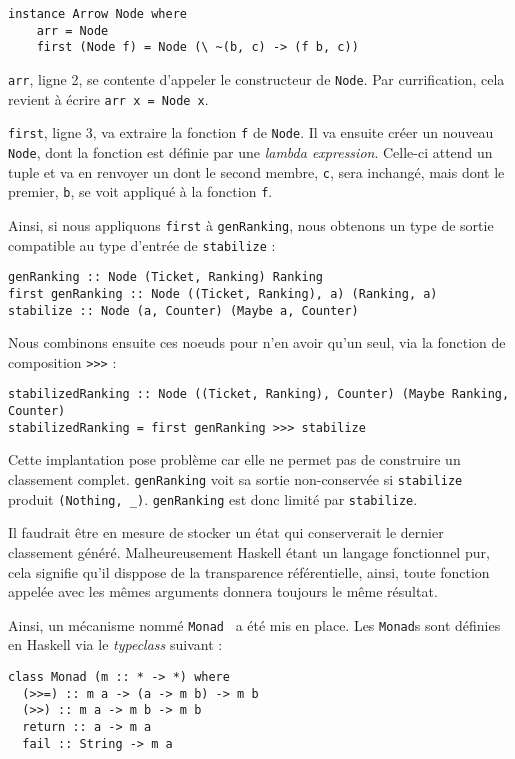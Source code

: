\documentclass{llncs}
\begin{document}
\begin{lstlisting}
instance Arrow Node where
    arr = Node
    first (Node f) = Node (\ ~(b, c) -> (f b, c))
\end{lstlisting}

\lstinline{arr}, ligne 2, se contente d'appeler le constructeur de \lstinline{Node}.
Par currification, cela revient à écrire \lstinline{arr x = Node x}.

\lstinline{first}, ligne 3, va extraire la fonction \lstinline{f} de \lstinline{Node}.
Il va ensuite créer un nouveau \lstinline{Node}, dont la fonction est définie par
une \emph{lambda expression}.
Celle-ci attend un tuple et va en renvoyer un dont le second membre, \lstinline{c},
sera inchangé, mais dont le premier, \lstinline{b}, se voit appliqué à la fonction \lstinline{f}.

Ainsi, si nous appliquons \lstinline{first} à \lstinline{genRanking}, nous obtenons
un type de sortie compatible au type d'entrée de \lstinline{stabilize} :
\begin{lstlisting}
genRanking :: Node (Ticket, Ranking) Ranking
first genRanking :: Node ((Ticket, Ranking), a) (Ranking, a)
stabilize :: Node (a, Counter) (Maybe a, Counter)
\end{lstlisting}

Nous combinons ensuite ces noeuds pour n'en avoir qu'un seul, via la fonction
de composition \lstinline{>>>} :
\begin{lstlisting}
stabilizedRanking :: Node ((Ticket, Ranking), Counter) (Maybe Ranking, Counter)
stabilizedRanking = first genRanking >>> stabilize
\end{lstlisting}

Cette implantation pose problème car elle ne permet pas de construire un classement
complet. \lstinline{genRanking} voit sa sortie non-conservée si \lstinline{stabilize}
produit \lstinline{(Nothing, _)}.
\lstinline{genRanking} est donc limité par \lstinline{stabilize}.

Il faudrait être en mesure de stocker un état qui conserverait le dernier classement
généré.
Malheureusement Haskell étant un langage fonctionnel pur, cela signifie qu'il disppose
de la transparence référentielle, ainsi, toute fonction appelée avec les mêmes arguments
donnera toujours le même résultat.

Ainsi, un mécanisme nommé \lstinline{Monad}~\cite{Wadler90} a été mis en place.
Les \lstinline{Monad}s sont définies en Haskell via le \emph{typeclass} suivant :
\begin{lstlisting}
class Monad (m :: * -> *) where
  (>>=) :: m a -> (a -> m b) -> m b
  (>>) :: m a -> m b -> m b
  return :: a -> m a
  fail :: String -> m a
\end{lstlisting}
\end{document}
